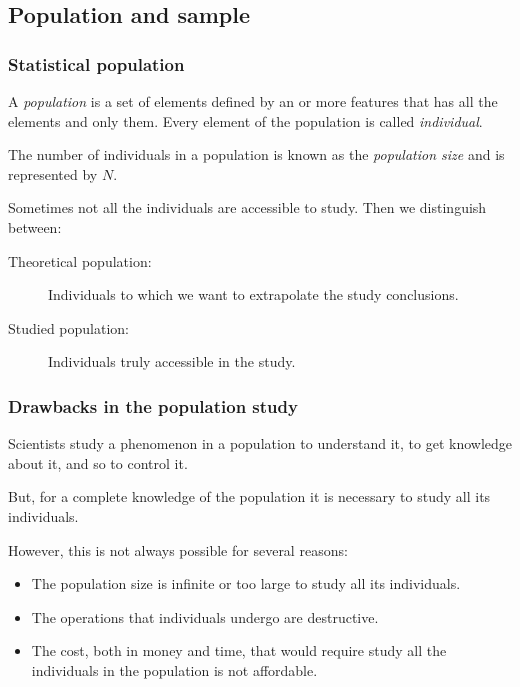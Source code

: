 \subsection{Population and sample}
\begin{frame}
\frametitle{Statistical population}
\begin{definition}[Population]
A \emph{population} is a set of elements defined by an or more features that has all the elements and only them.
Every element of the population is called \emph{individual}.
\end{definition}

\begin{definition}
The number of individuals in a population is known as the \emph{population size} and is represented by $N$.
\end{definition}

Sometimes not all the individuals are accessible to study. 
Then we distinguish between:
\begin{description}
\item [Theoretical population:] Individuals to which we want to extrapolate the study conclusions.
\item [Studied population:] Individuals truly accessible in the study.
\end{description}
\end{frame}


\begin{frame}
\frametitle{Drawbacks in the population study}
Scientists study a phenomenon in a population to understand it, to get knowledge about it, and so to control it.

But, for a complete knowledge of the population it is necessary to study all its individuals.

However, this is not always possible for several reasons:
\begin{itemize}
\item The population size is infinite or too large to study all its individuals.  
\item The operations that individuals undergo are destructive.
\item The cost, both in money and time, that would require study all the individuals in the population is not affordable. 
\end{itemize}
\end{frame}



